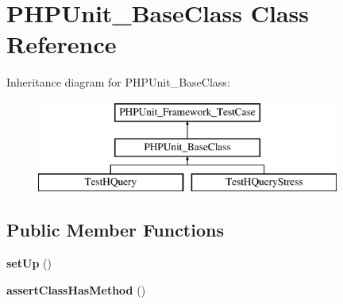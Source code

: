 \hypertarget{classPHPUnit__BaseClass}{}\section{P\+H\+P\+Unit\+\_\+\+Base\+Class Class Reference}
\label{classPHPUnit__BaseClass}
Inheritance diagram for P\+H\+P\+Unit\+\_\+\+Base\+Class\+:\begin{figure}[H]
\begin{center}
\leavevmode
\includegraphics[height=3.000000cm]{classPHPUnit__BaseClass}
\end{center}
\end{figure}
\subsection*{Public Member Functions}
\begin{DoxyCompactItemize}
\item 
\mbox{\label{classPHPUnit__BaseClass_a75c51dab1cca92e8cba66abe68943f37}} 
{\bfseries set\+Up} ()
\item 
\mbox{\label{classPHPUnit__BaseClass_a3dccf1a01b78bbe8bf1f053437a7e7f9}} 
{\bfseries assert\+Class\+Has\+Method} ()
\end{DoxyCompactItemize}
